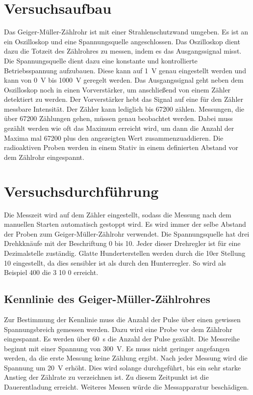 


\section{Versuchsaufbau}
Das Geiger-Müller-Zählrohr ist mit einer Strahlenschutzwand umgeben. Es ist an ein Oszilloskop und eine Spannungsquelle angeschlossen.
Das Oszilloskop dient dazu die Totzeit des Zählrohres zu messen, indem es das Ausgangssignal misst. Die Spannungsquelle dient dazu eine 
konstante und kontrollierte Betriebsspannung aufzubauen. Diese kann auf \qty{1}{\volt} genau eingestellt werden und kann von 
\qty{0}{\volt} bis \qty{1000}{\volt} geregelt werden. Das Ausgangssignal geht neben dem Oszilloskop noch in einen Vorverstärker, um 
anschließend von einem Zähler detektiert zu werden. Der Vorverstärker hebt das Signal auf eine für den Zähler messbare Intensität. Der 
Zähler kann lediglich bis 67200 zählen. Messungen, die über 67200 Zählungen gehen, müssen genau beobachtet werden. Dabei muss gezählt 
werden wie oft das Maximum erreicht wird, um dann die Anzahl der Maxima mal 67200 plus den angezeigten Wert zusammenzuaddieren. Die 
radioaktiven Proben werden in einem Stativ in einem definierten Abstand vor dem Zählrohr eingespannt.  


\section{Versuchsdurchführung}
Die Messzeit wird auf dem Zähler eingestellt, sodass die Messung nach dem manuellen Starten automatisch gestoppt wird. Es wird immer 
der selbe Abstand der Proben zum Geiger-Müller-Zählrohr verwendet. Die Spannungsquelle hat drei Drehkknäufe mit der Beschriftung 0 bis 
10. Jeder dieser Drehregler ist für eine Dezimalstelle zuständig. Glatte Hunderterstellen werden durch die 10er Stellung 10 eingestellt, 
da dies sensibler ist als durch den Hunterregler. So wird als Beispiel 400 die 3 10 0 erreicht.
\subsection{Kennlinie des Geiger-Müller-Zählrohres}
\noindent Zur Bestimmung der Kennlinie muss die Anzahl der Pulse über einen gewissen Spannungsbreich gemessen werden. Dazu wird eine Probe 
vor dem Zählrohr eingespannt. Es werden über \qty{60}{\second} die Anzahl der Pulse gezählt. Die Messreihe beginnt mit einer Spannung 
von \qty{300}{\volt}. Es muss nicht geringer angefangen werden, da die erste Messung keine Zählung ergibt. Nach jeder Messung wird 
die Spannung um \qty{20}{\volt} erhöht. Dies wird solange durchgeführt, bis ein sehr starke Anstieg der Zählrate zu verzeichnen ist. 
Zu diesem Zeitpunkt ist die Dauerentladung erreicht. Weiteres Messen würde die Messapparatur beschädigen. 

